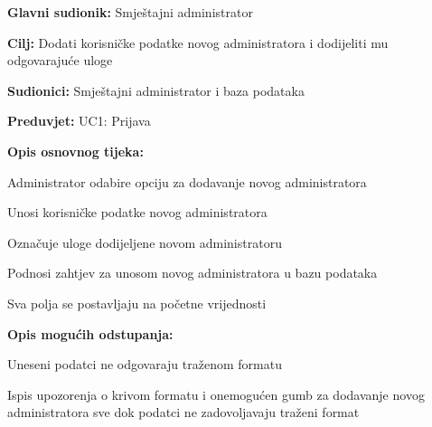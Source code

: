 					\noindent {}
					\begin{packed_item}
						
						\item \textbf{Glavni sudionik: }Smještajni administrator
						\item  \textbf{Cilj:} Dodati korisničke podatke novog administratora i dodijeliti mu odgovarajuće uloge
						\item  \textbf{Sudionici:} Smještajni administrator i baza podataka
						\item  \textbf{Preduvjet:} UC1: Prijava
						\item  \textbf{Opis osnovnog tijeka:}
						
						\item[] \begin{packed_enum}
							
							\item Administrator odabire opciju za dodavanje novog administratora
							\item Unosi korisničke podatke novog administratora
							\item Označuje uloge dodijeljene novom administratoru
							\item Podnosi zahtjev za unosom novog administratora u bazu podataka
							\item Sva polja se postavljaju na početne vrijednosti
							
						\end{packed_enum}
						
						\item  \textbf{Opis mogućih odstupanja:}
						
						\item[] \begin{packed_item}
							
							\item[2.a] Uneseni podatci ne odgovaraju traženom formatu
							\item[] \begin{packed_enum}
								
								\item Ispis upozorenja o krivom formatu i onemogućen gumb za dodavanje novog administratora sve dok podatci ne zadovoljavaju traženi format
								
							\end{packed_enum}


\end{packed_item}
\end{packed_item}

